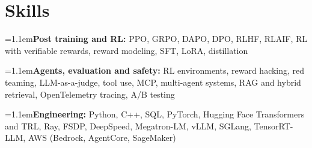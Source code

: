 \documentclass[11pt, letterpaper]{article}
\newcommand{\skill}[2]{\par{\raggedright\noindent\hangindent=1.1em\hangafter=1\textbf{#1:} #2\par}\vspace{4pt}}
\begin{document}
\section{Skills}
\skill{Post training and RL}{PPO, GRPO, DAPO, DPO, RLHF, RLAIF, RL with verifiable rewards, reward modeling, SFT, LoRA, distillation}
\skill{Agents, evaluation and safety}{RL environments, reward hacking, red teaming, LLM-as-a-judge, tool use, MCP, multi-agent systems, RAG and hybrid retrieval, OpenTelemetry tracing, A/B testing}
\skill{Engineering}{Python, C++, SQL, PyTorch, Hugging Face Transformers and TRL, Ray, FSDP, DeepSpeed, Megatron-LM, vLLM, SGLang, TensorRT-LLM, AWS (Bedrock, AgentCore, SageMaker)}
\end{document}
